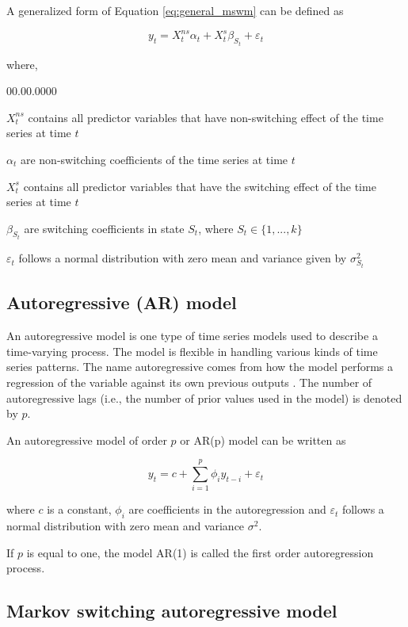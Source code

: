 A generalized form of Equation \ref{eq:general_mswm} can be defined
as \citep{perlin2015ms_regress}

\begin{equation}
y_{t}=X_{t}^{ns}\alpha_{t}+X_{t}^{s}\beta_{S_{t}}+\varepsilon_{t}
\end{equation}

where, 
\begin{labeling}{00.00.0000}
\item [{$X_{t}^{ns}$}] contains all predictor variables that have non-switching
effect of the time series at time $t$
\item [{$\alpha_{t}$}] are non-switching coefficients of the time series
at time $t$
\item [{$X_{t}^{s}$}] contains all predictor variables that have the switching
effect of the time series at time $t$
\item [{$\beta_{S_{t}}$}] are switching coefficients in state $S_{t}$,
where $S_{t}\in\{1,...,k\}$
\item [{$\varepsilon_{t}$}] follows a normal distribution with zero mean
and variance given by $\sigma_{S_{t}}^{2}$ 
\end{labeling}

\subsection{Autoregressive (AR) model}

An autoregressive model is one type of time series models used to
describe a time-varying process. The model is flexible in handling
various kinds of time series patterns. The name autoregressive comes
from how the model performs a regression of the variable against its
own previous outputs \citep{cryer1986time}. The number of autoregressive
lags (i.e., the number of prior values used in the model) is denoted
by $p$. 
\begin{defn}
An autoregressive model of order $p$ or AR(p) model can be written
as 

\[
y_{t}=c+\sum_{i=1}^{p}\phi_{i}y_{t-i}+\varepsilon_{t}
\]

where $c$ is a constant, $\phi_{i}$ are coefficients in the autoregression
and $\varepsilon_{t}$ follows a normal distribution with zero mean
and variance $\sigma^{2}$.
\end{defn}
If $p$ is equal to one, the model AR(1) is called the first order
autoregression process.

\subsection{Markov switching autoregressive model}

